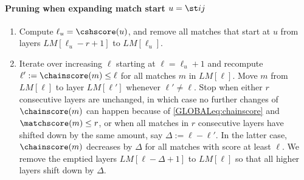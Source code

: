 \paragraph{Pruning when expanding match start $u = \st ij$}
\newcommand{\algletter}{P}
\begin{enumerate}
  \addtocounter{enumi}{1} %
  \item Compute $\ell_u=\cshscore(u)$, and remove all matches that start at $u$
        from layers $LM[\ell_u - r+1]$ to $LM[\ell_u]$.
  \item Iterate over increasing $\ell$ starting at $\ell=\ell_u+1$ and
        recompute $\ell':=\chainscore(m)\leq \ell$ for all matches $m$ in
        $LM[\ell]$. Move $m$ from $LM[\ell]$ to layer $LM[\ell']$ whenever
        $\ell' \neq \ell$. Stop when either $r$ consecutive layers are
        unchanged, in which case no further changes of $\chainscore(m)$ can
        happen because of \cref{GLOBALeq:chainscore} and $\matchscore(m) \leq r$, or
        when all matches in $r$ consecutive layers have shifted down by the same
        amount, say ${\Delta := \ell-\ell'}$. In the latter case,
        $\chainscore(m)$ decreases by $\Delta$ for all matches with score at
        least $\ell$. We remove the emptied layers ${LM[\ell-\Delta+1]}$ to
        $LM[\ell]$ so that all higher layers shift down by $\Delta$.
\end{enumerate}





\renewcommand\theenumi{\arabic{enumi}}
\renewcommand\labelenumi{{\rmfamily \arabic{enumi}.}}
\setlength{\leftmargini}{3mm}
